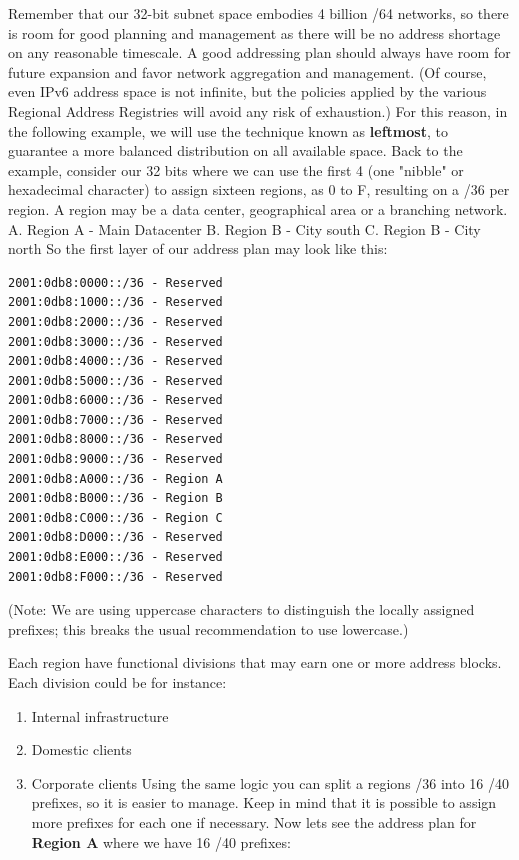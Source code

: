 \documentclass[
]{article}
\providecommand{\tightlist}{%
  \setlength{\itemsep}{0pt}\setlength{\parskip}{0pt}}
\begin{document}
Remember that our 32-bit subnet space embodies 4 billion /64 networks,
so there is room for good planning and management as there will be no
address shortage on any reasonable timescale. A good addressing plan
should always have room for future expansion and favor network
aggregation and management. (Of course, even IPv6 address space is not
infinite, but the policies applied by the various Regional Address
Registries will avoid any risk of exhaustion.) For this reason, in the
following example, we will use the technique known as \textbf{leftmost},
to guarantee a more balanced distribution on all available space. Back
to the example, consider our 32 bits where we can use the first 4 (one
"nibble" or hexadecimal character) to assign sixteen regions, as 0 to F,
resulting on a /36 per region. A region may be a data center,
geographical area or a branching network. A. Region A - Main Datacenter
B. Region B - City south C. Region B - City north So the first layer of
our address plan may look like this:

\begin{verbatim}
2001:0db8:0000::/36 - Reserved
2001:0db8:1000::/36 - Reserved
2001:0db8:2000::/36 - Reserved
2001:0db8:3000::/36 - Reserved
2001:0db8:4000::/36 - Reserved
2001:0db8:5000::/36 - Reserved
2001:0db8:6000::/36 - Reserved
2001:0db8:7000::/36 - Reserved
2001:0db8:8000::/36 - Reserved
2001:0db8:9000::/36 - Reserved
2001:0db8:A000::/36 - Region A
2001:0db8:B000::/36 - Region B
2001:0db8:C000::/36 - Region C
2001:0db8:D000::/36 - Reserved
2001:0db8:E000::/36 - Reserved
2001:0db8:F000::/36 - Reserved
\end{verbatim}

(Note: We are using uppercase characters to distinguish the locally
assigned prefixes; this breaks the usual recommendation to use
lowercase.)

Each region have functional divisions that may earn one or more address
blocks. Each division could be for instance:

\begin{enumerate}
\def\labelenumi{\arabic{enumi}.}
\tightlist
\item
  Internal infrastructure
\item
  Domestic clients
\item
  Corporate clients Using the same logic you can split a
  region\textquotesingle s /36 into 16 /40 prefixes, so it is easier to
  manage. Keep in mind that it is possible to assign more prefixes for
  each one if necessary. Now let\textquotesingle s see the address plan
  for \textbf{Region A} where we have 16 /40 prefixes:
\end{enumerate}
\end{document}
